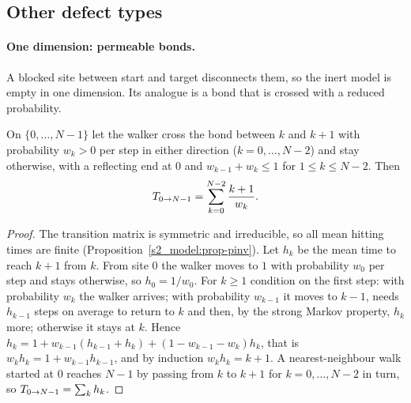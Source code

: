 \subsection{Other defect types}\label{sup_defects:ssec-other}

\paragraph{One dimension: permeable bonds.} A blocked site between start and target disconnects them, so the
inert model is empty in one dimension. Its analogue is a bond that is crossed with a reduced probability.

\begin{proposition}\label{s8_defects_placement:prop-1d-barriers}
On $\{0,\dots,N-1\}$ let the walker cross the bond between $k$ and $k+1$ with probability $w_k>0$ per step in
either direction ($k=0,\dots,N-2$) and stay otherwise, with a reflecting end at $0$ and
$w_{k-1}+w_{k}\le1$ for $1\le k\le N-2$. Then
\begin{equation}\label{s8_defects_placement:eq-1d-barriers}
  T_{0\to N-1}=\sum_{k=0}^{N-2}\frac{k+1}{w_k}.
\end{equation}
\end{proposition}
\begin{proof}
The transition matrix is symmetric and irreducible, so all mean hitting times are finite
(Proposition~\ref{s2_model:prop-pinv}). Let $h_k$ be the mean time to reach $k+1$ from $k$. From site $0$ the
walker moves to $1$ with probability $w_0$ per step and stays otherwise, so $h_0=1/w_0$. For $k\ge1$ condition on
the first step: with probability $w_k$ the walker arrives; with probability $w_{k-1}$ it moves to $k-1$, needs
$h_{k-1}$ steps on average to return to $k$ and then, by the strong Markov property, $h_k$ more; otherwise it
stays at $k$. Hence $h_k=1+w_{k-1}(h_{k-1}+h_k)+(1-w_{k-1}-w_k)h_k$, that is $w_kh_k=1+w_{k-1}h_{k-1}$, and by
induction $w_kh_k=k+1$. A nearest-neighbour walk started at $0$ reaches $N-1$ by passing from $k$ to $k+1$ for
$k=0,\dots,N-2$ in turn, so $T_{0\to N-1}=\sum_kh_k$.
\end{proof}

